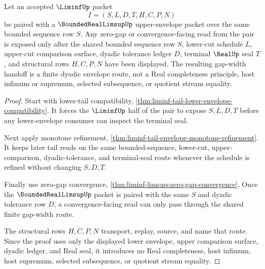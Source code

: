 \begin{theorem}
\label{thm:liminf-tail-lower-upper-gap-width}
Let an accepted $\LiminfUp$ packet
$$
I=(S,L,D,T,H,C,P,N)
$$
be paired with a $\BoundedRealLimsupUp$ upper-envelope packet over the same bounded sequence row $S$. Any zero-gap or convergence-facing read from the pair is exposed only after the shared bounded sequence row $S$, lower-cut schedule $L$, upper-cut comparison surface, dyadic tolerance ledger $D$, terminal $\RealUp$ seal $T$, and structural rows $H,C,P,N$ have been displayed. The resulting gap-width handoff is a finite dyadic envelope route, not a Real completeness principle, host infimum or supremum, selected subsequence, or quotient stream equality.
\end{theorem}
\begin{proof}
Start with lower-tail compatibility, \autoref{thm:liminf-tail-lower-envelope-compatibility}. It forces the $\LiminfUp$ half of the pair to expose $S,L,D,T$ before any lower-envelope consumer can inspect the terminal seal.

Next apply monotone refinement, \autoref{thm:liminf-tail-envelope-monotone-refinement}. It keeps later tail reads on the same bounded-sequence, lower-cut, upper-comparison, dyadic-tolerance, and terminal-seal route whenever the schedule is refined without changing $S,D,T$.

Finally use zero-gap convergence, \autoref{thm:liminf-limsup-zero-gap-convergence}. Once the $\BoundedRealLimsupUp$ packet is paired with the same $S$ and dyadic tolerance row $D$, a convergence-facing read can only pass through the shared finite gap-width route.

The structural rows $H,C,P,N$ transport, replay, source, and name that route. Since the proof uses only the displayed lower envelope, upper comparison surface, dyadic ledger, and Real seal, it introduces no Real completeness, host infimum, host supremum, selected subsequence, or quotient stream equality.
\end{proof}

